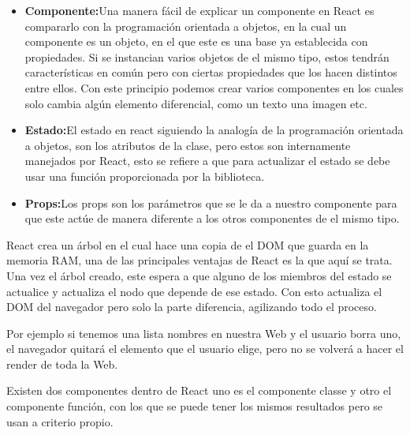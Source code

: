 \begin{itemize}
\begin{itemize}
 
 \item \textbf{Componente:}Una manera fácil de explicar un componente en React es compararlo con la programación orientada a objetos, en la cual un componente es un objeto, en el que este es una base ya establecida con propiedades. Si se instancian varios objetos de el mismo tipo, estos tendrán características en común pero con ciertas propiedades que los hacen distintos entre ellos. Con este principio podemos crear varios componentes en los cuales solo cambia algún elemento diferencial, como un texto una imagen etc.
  \item \textbf{Estado:}El estado en react siguiendo la analogía de la programación orientada a objetos, son los atributos de la clase, pero estos son internamente manejados por React, esto se refiere a que para actualizar el estado se debe usar una función proporcionada por la biblioteca.
   \item \textbf{Props:}Los props son los parámetros  que se le da a nuestro componente para que este actúe de manera diferente a los otros componentes de el mismo tipo.
 \end{itemize}
 React crea un árbol en el cual hace una copia de el DOM que guarda en la memoria RAM, una de las principales ventajas de React es la que aquí se trata. Una vez el árbol creado, este espera a que alguno de los miembros del estado se actualice y actualiza el nodo que depende de ese estado. Con esto actualiza el DOM del navegador pero solo la parte diferencia, agilizando todo el proceso.

Por ejemplo si tenemos una lista nombres en nuestra Web y el usuario borra uno, el navegador quitará el elemento que el usuario elige, pero no se volverá a hacer el render de toda la Web.

Existen dos componentes dentro de React uno es el componente classe y otro el componente función, con los que se puede tener los mismos resultados pero se usan a criterio propio.


\end{itemize}
